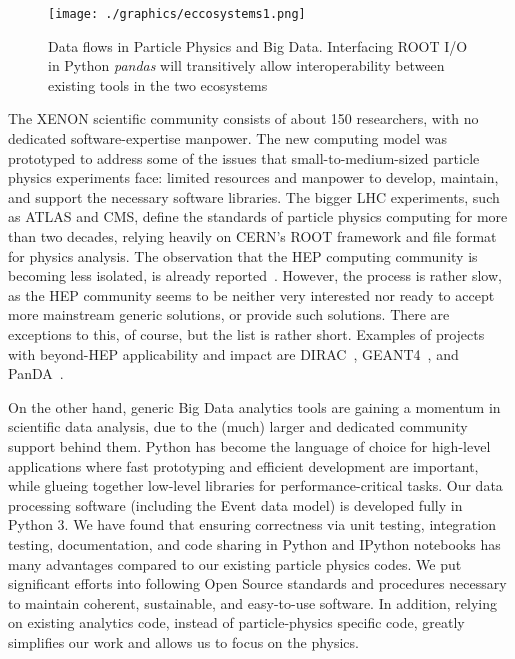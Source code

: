 \documentclass[a4paper]{jpconf}
\begin{document}
\begin{figure}[!t]
\centering
\begin{center}
\texttt{[image: ./graphics/eccosystems1.png]}
\caption{Data flows in Particle Physics and Big Data. Interfacing ROOT I/O in Python \textit{pandas} will transitively allow interoperability between existing tools in the two ecosystems}
\label{fig:two_eccosystems}
\end{center}
\end{figure}
The XENON scientific community consists of about 150 researchers, with no dedicated software-expertise manpower. 
The new computing model was prototyped to address some of the issues that small-to-medium-sized particle physics 
experiments face: limited resources and manpower to develop, maintain, and support the necessary software libraries.
The bigger LHC experiments, such as ATLAS and CMS, define the standards of particle physics computing for more than two decades, relying
heavily on CERN's ROOT framework and file format for physics analysis. 
The observation that the HEP computing community is becoming less isolated, is already reported~\cite{1742-6596-513-5-052033}.
However, the process is rather slow, as the HEP community seems to be neither very interested nor ready to accept more mainstream generic solutions, or provide such solutions.
There are exceptions to this, of course, but the list is rather short. 
Examples of projects with beyond-HEP applicability and impact are DIRAC~\cite{1742-6596-119-6-062048}, GEANT4~\cite{agostinelli2003geant4}, and PanDA~\cite{Borodin:1670021}.

On the other hand, generic Big Data analytics tools are gaining a momentum in scientific data analysis, due to the (much) larger and dedicated community support behind them.
Python has become the language of choice for high-level applications where fast 
prototyping and efficient development are important, while glueing together 
low-level libraries for performance-critical tasks.
Our data processing software (including the Event data model) is developed fully in Python 3. 
We have found that ensuring correctness via unit testing, integration testing, documentation, and code
sharing in Python and IPython notebooks has many advantages compared to our existing particle
physics codes. We put significant efforts into following Open Source standards and procedures necessary to maintain 
coherent, sustainable, and easy-to-use software. In addition, relying on existing analytics code, instead of particle-physics specific code, greatly
simplifies our work and allows us to focus on the physics.
\end{document}
